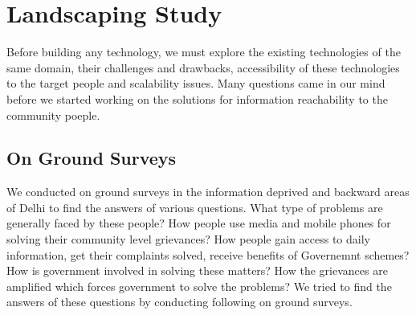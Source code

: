 \chapter{Landscaping Study}

Before building any technology, we must explore the existing technologies of the same domain, their challenges and drawbacks, accessibility of these technologies to the target people and scalability issues. Many questions came in our mind before we started working on the solutions for information reachability to the community poeple.

\section {On Ground Surveys}
We conducted on ground surveys in the information deprived and backward areas of Delhi to find the answers of various questions. What type of problems are generally faced by these people? How people use media and mobile phones for solving their community level grievances? How people gain access to daily information, get their complaints solved, receive benefits of Governemnt schemes? How is government involved in solving these matters? How the grievances are amplified which forces government to solve the problems? We tried to find the answers of these questions by conducting following on ground surveys.

